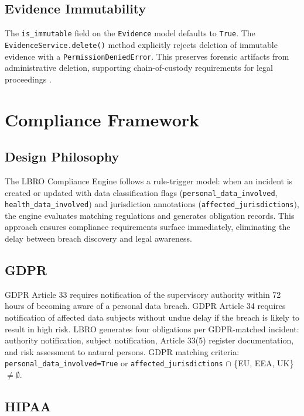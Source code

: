 \documentclass[conference]{IEEEtran}
\begin{document}
\subsection{Evidence Immutability}

The \texttt{is\_immutable} field on the \texttt{Evidence} model defaults to \texttt{True}. The \texttt{EvidenceService.delete()} method explicitly rejects deletion of immutable evidence with a \texttt{PermissionDeniedError}. This preserves forensic artifacts from administrative deletion, supporting chain-of-custody requirements for legal proceedings \cite{casey2011digital}.

\section{Compliance Framework}

\subsection{Design Philosophy}

The LBRO Compliance Engine follows a rule-trigger model: when an incident is created or updated with data classification flags (\texttt{personal\_data\_involved}, \texttt{health\_data\_involved}) and jurisdiction annotations (\texttt{affected\_jurisdictions}), the engine evaluates matching regulations and generates obligation records. This approach ensures compliance requirements surface immediately, eliminating the delay between breach discovery and legal awareness.

\subsection{GDPR}

GDPR Article 33 requires notification of the supervisory authority within 72 hours of becoming aware of a personal data breach. GDPR Article 34 requires notification of affected data subjects without undue delay if the breach is likely to result in high risk. LBRO generates four obligations per GDPR-matched incident: authority notification, subject notification, Article 33(5) register documentation, and risk assessment to natural persons. GDPR matching criteria: \texttt{personal\_data\_involved=True} or \texttt{affected\_jurisdictions} $\cap$ \{EU, EEA, UK\} $\neq \emptyset$.

\subsection{HIPAA}
\end{document}
